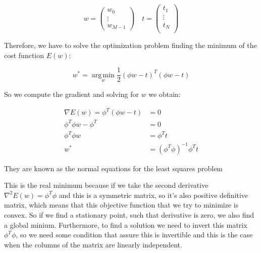 \begin{Equation}[!htb]
	\centering
	\begin{equation}
	w = 
	\begin{pmatrix}
	w_0 \\
	\vdots \\
	w_{M-1}
	\end{pmatrix}
	\quad t =
	\begin{pmatrix}
	t_1 \\
	\vdots \\
	t_N \\
	\end{pmatrix}
	\end{equation}
	\label{eq:hommatrix}
\end{Equation}

\noindent Therefore, we have to solve the optimization problem finding the minimum of the cost function $E(w)$:
\begin{Equation}[H]
	\centering
	\begin{equation}
	w^*= \operatorname*{arg\,min}_w  \frac{1}{2}(\phi w - t)^T (\phi w - t)
	\end{equation}
	\label{eq:mathmodelaada}
\end{Equation}

\noindent So we compute the gradient and solving for $w$ we obtain:
\begin{Equation}[H]
	\centering
	\begin{equation}
		\begin{aligned}
			\nabla E(w) = \phi^T(\phi w - t) &= 0 \\
			\phi^T \phi w - \phi^T &= 0 \\
			\phi^T \phi w &= \phi^T t \\
			w^* &= (\phi^T \phi)^{-1} \phi^T t
		\end{aligned}
	\end{equation}
	\caption[Normal equations.]{They are known as the normal equations for the least squares problem}
	\label{eq:mathmodelaada}
\end{Equation}

\noindent This is the real minimum because if we take the second derivative $ \nabla^2 E(w) = \phi^T \phi $ and this is a symmetric matrix, so it's also positive definitive matrix, which means that this objective function that we try to minimize is convex. So if we find a stationary point, such that derivative is zero, we also find a global minium. Furthermore, to find a solution we need to invert this matrix $ \phi^T \phi $, so we need some condition that assure this is invertible and this is the case when the columns of the matrix are linearly independent. 

